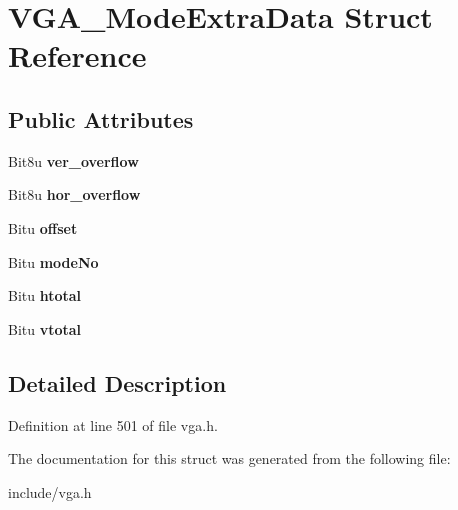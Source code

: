 \hypertarget{structVGA__ModeExtraData}{\section{V\-G\-A\-\_\-\-Mode\-Extra\-Data Struct Reference}
\label{structVGA__ModeExtraData}
}
\subsection*{Public Attributes}
\begin{DoxyCompactItemize}
\item 
\hypertarget{structVGA__ModeExtraData_a020b5a995f7d52935b5e4fb5899fe72d}{Bit8u {\bfseries ver\-\_\-overflow}}\label{structVGA__ModeExtraData_a020b5a995f7d52935b5e4fb5899fe72d}

\item 
\hypertarget{structVGA__ModeExtraData_a60204db357ea608c5f03a8d59c80d3ff}{Bit8u {\bfseries hor\-\_\-overflow}}\label{structVGA__ModeExtraData_a60204db357ea608c5f03a8d59c80d3ff}

\item 
\hypertarget{structVGA__ModeExtraData_a11bba06bf4bcd5cb9aca1442e5d9b368}{Bitu {\bfseries offset}}\label{structVGA__ModeExtraData_a11bba06bf4bcd5cb9aca1442e5d9b368}

\item 
\hypertarget{structVGA__ModeExtraData_a4af1e6bf83f95024c09802255715702a}{Bitu {\bfseries mode\-No}}\label{structVGA__ModeExtraData_a4af1e6bf83f95024c09802255715702a}

\item 
\hypertarget{structVGA__ModeExtraData_a21c6015134a307927a2ab9915c2dfb41}{Bitu {\bfseries htotal}}\label{structVGA__ModeExtraData_a21c6015134a307927a2ab9915c2dfb41}

\item 
\hypertarget{structVGA__ModeExtraData_a9410324359daa0b31e4026d9e70aeae0}{Bitu {\bfseries vtotal}}\label{structVGA__ModeExtraData_a9410324359daa0b31e4026d9e70aeae0}

\end{DoxyCompactItemize}


\subsection{Detailed Description}


Definition at line 501 of file vga.\-h.



The documentation for this struct was generated from the following file\-:\begin{DoxyCompactItemize}
\item 
include/vga.\-h\end{DoxyCompactItemize}
